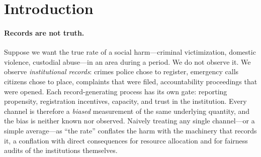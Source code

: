 \documentclass[11pt]{article}
\theoremstyle{definition}
\theoremstyle{remark}
\newcommand{\Var}{\operatorname{Var}}
\begin{document}
\begin{abstract}
On synthetic ground truth the over-ID test attains
size $\le 0.05$ and power $\approx 1.00$ against detectable confounders and
provably $0.00$ against common-mode confounders; observed-value coverage is
exact ($0.90$) and latent coverage is $\approx 0.89$; proximal
point-identification holds $\Var(\theta)$ at the truth $0.61$ across
common-mode strengths $\{0,0.5,1.0,1.5,2.0\}$ where the naive estimate
inflates to $\{0.61,0.77,1.25,2.05,3.18\}$, with bootstrap CIs covering truth;
the exclusion-sensitivity band collapses to the point estimate at zero
violation, widens with it, and contains the true $\Var(\theta)$ under a known
injected violation; and the monitor holds an anytime false-alarm rate of
$0.013\le0.05$ over long null streams while detecting a structural drift with
median delay $\approx 9$ windows. On India NCRB state-year data (2001--2010,
$N{=}253$, four institutional channels) the one-factor law is not rejected in
detectable directions ($p{=}0.088$); as a two-directional check of the
specification test, a cross-national run on real Chicago and NYC data
(2018--2023) treating the three crime \emph{categories} as shared-filter
pseudo-channels is correctly \emph{rejected} ($p<0.001$). We make no
claim of distribution-free finite-sample \emph{latent} coverage---which we
prove is impossible---only exact coverage for observed values and
asymptotic coverage for the latent rate.
\end{abstract}

\section{Introduction}\label{sec:intro}

\paragraph{Records are not truth.}
Suppose we want the true rate of a social harm---criminal victimization,
domestic violence, custodial abuse---in an area during a period. We do not
observe it. We observe \emph{institutional records}: crimes police chose to
register, emergency calls citizens chose to place, complaints that were
filed, accountability proceedings that were opened. Each record-generating
process has its own gate: reporting propensity, registration incentives,
capacity, and trust in the institution. Every channel is therefore a
\emph{biased} measurement of the same underlying quantity, and the bias is
neither known nor observed. Naively treating any single channel---or a
simple average---as ``the rate'' conflates the harm with the machinery that
records it, a conflation with direct consequences for resource allocation
and for fairness audits of the institutions themselves.
\end{document}
